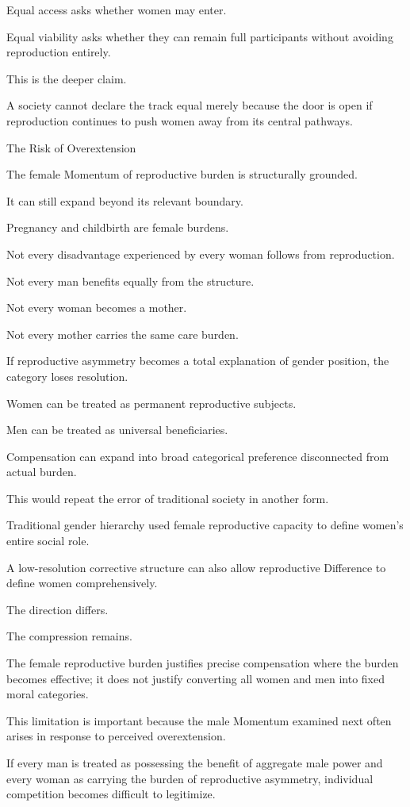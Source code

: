 Equal access asks whether women may enter.

Equal viability asks whether they can remain full participants without avoiding reproduction entirely.

This is the deeper claim.

A society cannot declare the track equal merely because the door is open if reproduction continues to push women away from its central pathways.

The Risk of Overextension

The female Momentum of reproductive burden is structurally grounded.

It can still expand beyond its relevant boundary.

Pregnancy and childbirth are female burdens.

Not every disadvantage experienced by every woman follows from reproduction.

Not every man benefits equally from the structure.

Not every woman becomes a mother.

Not every mother carries the same care burden.

If reproductive asymmetry becomes a total explanation of gender position, the category loses resolution.

Women can be treated as permanent reproductive subjects.

Men can be treated as universal beneficiaries.

Compensation can expand into broad categorical preference disconnected from actual burden.

This would repeat the error of traditional society in another form.

Traditional gender hierarchy used female reproductive capacity to define women’s entire social role.

A low-resolution corrective structure can also allow reproductive Difference to define women comprehensively.

The direction differs.

The compression remains.

The female reproductive burden justifies precise compensation where the burden becomes effective; it does not justify converting all women and men into fixed moral categories.

This limitation is important because the male Momentum examined next often arises in response to perceived overextension.

If every man is treated as possessing the benefit of aggregate male power and every woman as carrying the burden of reproductive asymmetry, individual competition becomes difficult to legitimize.

